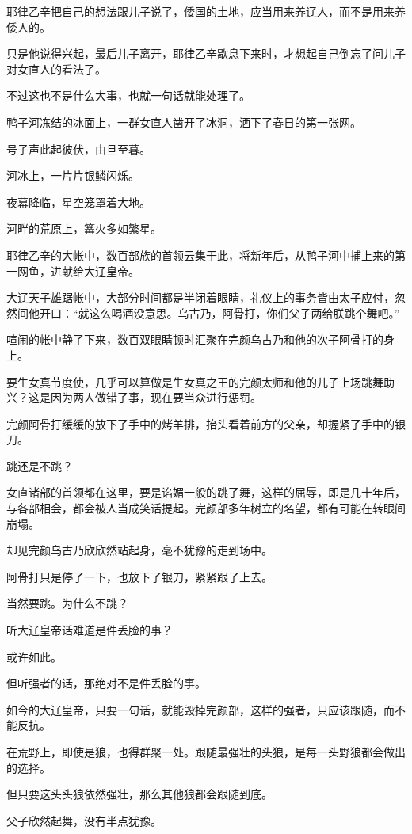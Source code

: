 耶律乙辛把自己的想法跟儿子说了，倭国的土地，应当用来养辽人，而不是用来养倭人的。

只是他说得兴起，最后儿子离开，耶律乙辛歇息下来时，才想起自己倒忘了问儿子对女直人的看法了。

不过这也不是什么大事，也就一句话就能处理了。

鸭子河冻结的冰面上，一群女直人凿开了冰洞，洒下了春日的第一张网。

号子声此起彼伏，由旦至暮。

河冰上，一片片银鳞闪烁。

夜幕降临，星空笼罩着大地。

河畔的荒原上，篝火多如繁星。

耶律乙辛的大帐中，数百部族的首领云集于此，将新年后，从鸭子河中捕上来的第一网鱼，进献给大辽皇帝。

大辽天子雄踞帐中，大部分时间都是半闭着眼睛，礼仪上的事务皆由太子应付，忽然间他开口：“就这么喝酒没意思。乌古乃，阿骨打，你们父子两给朕跳个舞吧。”

喧闹的帐中静了下来，数百双眼睛顿时汇聚在完颜乌古乃和他的次子阿骨打的身上。

要生女真节度使，几乎可以算做是生女真之王的完颜太师和他的儿子上场跳舞助兴？这是因为两人做错了事，现在要当众进行惩罚。

完颜阿骨打缓缓的放下了手中的烤羊排，抬头看着前方的父亲，却握紧了手中的银刀。

跳还是不跳？

女直诸部的首领都在这里，要是谄媚一般的跳了舞，这样的屈辱，即是几十年后，与各部相会，都会被人当成笑话提起。完颜部多年树立的名望，都有可能在转眼间崩塌。

却见完颜乌古乃欣欣然站起身，毫不犹豫的走到场中。

阿骨打只是停了一下，也放下了银刀，紧紧跟了上去。

当然要跳。为什么不跳？

听大辽皇帝话难道是件丢脸的事？

或许如此。

但听强者的话，那绝对不是件丢脸的事。

如今的大辽皇帝，只要一句话，就能毁掉完颜部，这样的强者，只应该跟随，而不能反抗。

在荒野上，即使是狼，也得群聚一处。跟随最强壮的头狼，是每一头野狼都会做出的选择。

但只要这头头狼依然强壮，那么其他狼都会跟随到底。

父子欣然起舞，没有半点犹豫。
